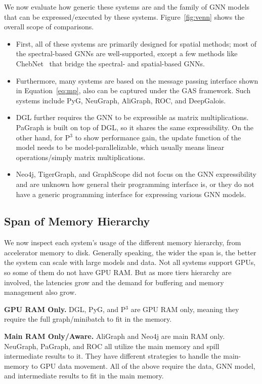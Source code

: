 We now evaluate how generic these systems are and the family of GNN models that can be expressed/executed by these systems. Figure~\ref{fig:venn} shows the overall scope of comparisons. 
\begin{itemize}
\item First, all of these systems are primarily designed for spatial methods; most of the spectral-based GNNs are well-supported, except a few methods like ChebNet~\cite{chebnet} that bridge the spectral- and spatial-based GNNs. 
\item Furthermore, many systems are based on the message passing interface shown in Equation~\ref{eq:mp}, also can be captured under the GAS framework. Such systems include PyG, NeuGraph, AliGraph, ROC, and DeepGalois.
\item DGL further requires the GNN to be expressible as matrix multiplications. PaGraph is built on top of DGL, so it shares the same expressibility. On the other hand, for P$^{3}$ to show performance gain, the update function of the model needs to be model-parallelizable, which usually means linear operations/simply matrix multiplications.
\item Neo4j, TigerGraph, and GraphScope did not focus on the GNN expressibility and are unknown how general their programming interface is, or they do not have a generic programming interface for expressing various GNN models. 
\end{itemize}

\subsection{Span of Memory Hierarchy}
We now inspect each system's usage of the different memory hierarchy, from accelerator memory to disk. Generally speaking, the wider the span is, the better the system can scale with large models and data. Not all systems support GPUs, so some of them do not have GPU RAM. But as more tiers hierarchy are involved, the latencies grow and the demand for buffering and memory management also grow.

\vspace{2mm}
\noindent \textbf{GPU RAM Only.} DGL, PyG, and P$^{3}$ are GPU RAM only, meaning they require the full graph/minibatch to fit in the memory.


\vspace{2mm}
\noindent \textbf{Main RAM Only/Aware.} AliGraph and Neo4j are main RAM only. NeuGraph, PaGraph, and ROC all utilize the main memory and spill intermediate results to it. They have different strategies to handle the main-memory to GPU data movement. All of the above require the data, GNN model, and intermediate results to fit in the main memory.

